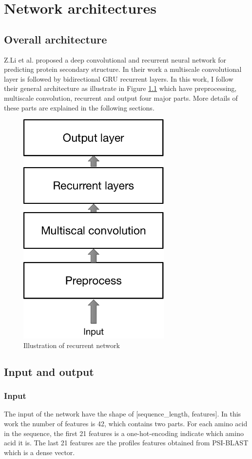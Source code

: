 \chapter{Network architectures}
	\label{CH_03}


\section{Overall architecture}
Z.Li et al. \cite{Z.Li2016} proposed a deep convolutional and recurrent neural network for predicting protein secondary structure. In their work a multiscale convolutional layer is followed by bidirectional GRU recurrent layers. In this work, I follow their general architecture as illustrate in Figure \ref{fig:overall_arch} which have preprocessing, multiscale convolution, recurrent and output four major parts. More details of these parts are explained in the following sections.
\begin{figure}[H] 
	\centering
	\includegraphics[width=3in]{Figures/overall_architecture}
	\caption[Detail inside recurrent unit]{Illustration of recurrent network}
	\label{fig:overall_arch}
\end{figure}

\section{Input and output}
\subsection{Input}
The input of the network have the shape of [sequence\_length, features]. In this work the number of features is 42, which contains two parts. For each amino acid in the sequence, the first 21 features is a one-hot-encoding indicate which amino acid it is. The last 21 features are the profiles features obtained from PSI-BLAST\cite{altschul1997gapped} which is a dense vector.
